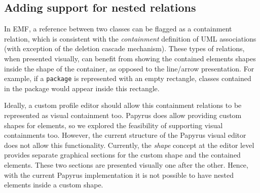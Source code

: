 \subsection{Adding support for nested relations}
In EMF, a reference between two classes can be flagged as a containment relation, which is consistent with the \emph{containment} definition of UML associations (with exception of the deletion cascade mechanism).
These types of relations, when presented visually, can benefit from showing the contained elements shapes inside the shape of the container, as opposed to the line/arrow presentation.
For example, if a \texttt{package} is represented with an empty rectangle, classes contained in the package would appear inside this rectangle.

Ideally, a custom profile editor should allow this containment relations to be represented as visual containment too.
Papyrus does allow providing custom shapes for elements, so we explored the feasibility of supporting visual containments too.
However, the current structure of the Papyrus visual editor does not allow this functionality.
Currently, the \emph{shape} concept at the editor level provides separate graphical sections for the custom shape and the contained elements.
These two sections are presented visually one after the other.
Hence, with the current Papyrus implementation it is not possible to have nested elements inside a custom shape.

